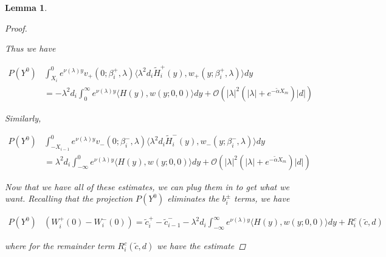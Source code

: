 \documentclass[12pt]{article}
\newtheorem{lemma}{Lemma}
\begin{document}
\begin{lemma}
\begin{proof}
\begin{enumerate}
Thus we have

\begin{align*}
P(Y^0) &\int_{X_i}^0 e^{\nu(\lambda)y} v_+(0; \beta_i^+, \lambda) \langle \lambda^2 d_i \tilde{H}_i^+(y), w_+(y; \beta_i^+, \lambda) \rangle dy \\
&= -\lambda^2 d_i \int_0^\infty e^{\nu(\lambda)y}  \langle H(y), w(y; 0, 0) \rangle dy 
+ \mathcal{O}(|\lambda|^2(|\lambda| + e^{-\tilde{\alpha} X_m})|d| )  
\end{align*}

Similarly,

\begin{align*}
P(Y^0) &\int_{-X_{i-1}}^0
e^{\nu(\lambda)y} v_-(0; \beta_i^-, \lambda) \langle \lambda^2 d_i \tilde{H}_i^-(y), w_-(y; \beta_i^-, \lambda) \rangle dy \\
&= \lambda^2 d_i \int_{-\infty}^0 e^{\nu(\lambda)y}  \langle H(y), w(y; 0, 0) \rangle dy 
+ \mathcal{O}(|\lambda|^2(|\lambda| + e^{-\tilde{\alpha} X_m})|d| ) 
\end{align*}

\end{enumerate}

Now that we have all of these estimates, we can plug them in to get what we want. Recalling that the projection $P(Y^0)$ eliminates the $b_i^\pm$ terms, we have

\begin{align*}
P(Y^0)&(W_i^+(0) - W_i^-(0)) 
= \tilde{c}_i^+ - \tilde{c}_{i-1}^- - \lambda^2 d_i \int_{-\infty}^\infty e^{\nu(\lambda)y}  \langle H(y), w(y; 0, 0) \rangle dy + R^c_i(\tilde{c},d)
\end{align*}

where for the remainder term $R^c_i(\tilde{c},d)$ we have the estimate


\end{proof}
\end{lemma}
\end{document}

